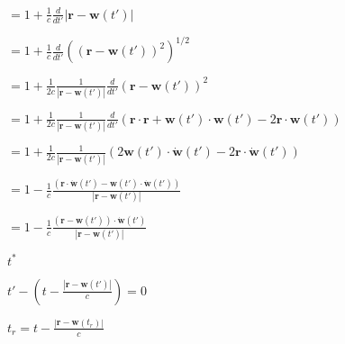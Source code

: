 \documentclass[12pt]{article}
\renewcommand{\vec}[1]{\boldsymbol{#1}}%
\def\lthtmlcheckvsize{\ifdim\ht\sizebox<\vsize 
  \ifdim\wd\sizebox<\hsize\expandafter\hfill\fi \expandafter\vfill
  \else\expandafter\vss\fi}%
\begin{document}
{\newpage\clearpage
{}%
$\displaystyle = 1 + \frac{1}{c} \frac{d}{dt'} |\vec{r} - \vec{w}(t')|$%
\lthtmlindisplaymathZ
\lthtmlcheckvsize\clearpage}

{\newpage\clearpage
{}%
$\displaystyle = 1 + \frac{1}{c} \frac{d}{dt'} \left( \left( \vec{r} - \vec{w}(t')\right)^2 \right)^{1/2}$%
\lthtmlindisplaymathZ
\lthtmlcheckvsize\clearpage}

{\newpage\clearpage
{}%
$\displaystyle = 1 + \frac{1}{2c} \frac{1}{ |\vec{r} - \vec{w}(t')| } \frac{d}{dt'}\left( \vec{r} - \vec{w}(t')\right)^2$%
\lthtmlindisplaymathZ
\lthtmlcheckvsize\clearpage}

{\newpage\clearpage
{}%
$\displaystyle = 1 + \frac{1}{2c} \frac{1}{ |\vec{r} - \vec{w}(t')| } \frac{d}{dt'}\left( \vec{r}\cdot \vec{r} + \vec{w}(t')\cdot \vec{w}(t') - 2\vec{r} \cdot \vec{w}(t')\right)$%
\lthtmlindisplaymathZ
\lthtmlcheckvsize\clearpage}

{\newpage\clearpage
{}%
$\displaystyle = 1 + \frac{1}{2c} \frac{1}{ |\vec{r} - \vec{w}(t')| } \left( 2 \vec{w}(t')\cdot  \dot{\vec{w}}(t') - 2\vec{r} \cdot
\dot{\vec{w}}(t')\right)$%
\lthtmlindisplaymathZ
\lthtmlcheckvsize\clearpage}

{\newpage\clearpage
{}%
$\displaystyle = 1 - \frac{1}{c} \frac{ \left( \vec{r} \cdot
\dot{\vec{w}}(t') - \vec{w}(t')\cdot  \dot{\vec{w}}(t') \right)  }{ |\vec{r} - \vec{w}(t')| }$%
\lthtmlindisplaymathZ
\lthtmlcheckvsize\clearpage}

{\newpage\clearpage
{}%
$\displaystyle = 1 - \frac{1}{c} \frac{ \left( \vec{r}  - \vec{w}(t')  \right)\cdot  \dot{\vec{w}}(t') }{ |\vec{r} - \vec{w}(t')| }$%
\lthtmlindisplaymathZ
\lthtmlcheckvsize\clearpage}

{\newpage\clearpage
{}%
$ t^*$%
\lthtmlindisplaymathZ
\lthtmlcheckvsize\clearpage}

{\newpage\clearpage
{}%
$\displaystyle t' - \left(t - \frac{|\vec{r} - \vec{w}(t')|}{c}\right) = 0$%
\lthtmlindisplaymathZ
\lthtmlcheckvsize\clearpage}

{\newpage\clearpage
{}%
$\displaystyle t_r = t - \frac{|\vec{r} - \vec{w}(t_r)|}{c}$%
\lthtmlindisplaymathZ
\lthtmlcheckvsize\clearpage}
\end{document}
